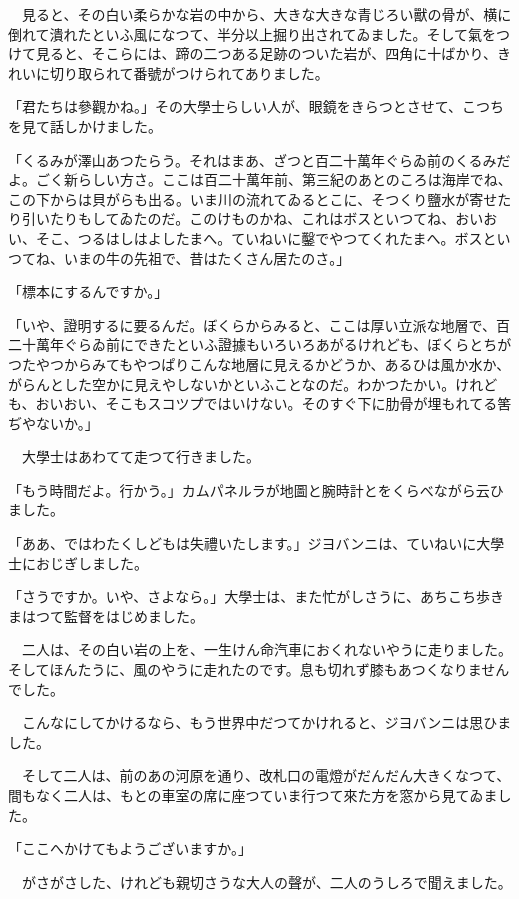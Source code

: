 \documentclass[tate,paper=b6j,jafontsize=9pt]{jlreq}
\begin{document}
　見ると、その白い柔らかな岩の中から、大きな大きな青じろい獸の骨が、横に倒れて潰れたといふ風になつて、半分以上掘り出されてゐました。そして氣をつけて見ると、そこらには、蹄の二つある足跡のついた岩が、四角に十ばかり、きれいに切り取られて番號がつけられてありました。

「君たちは參觀かね。」その大學士らしい人が、眼鏡をきらつとさせて、こつちを見て話しかけました。

「くるみが澤山あつたらう。それはまあ、ざつと百二十萬年ぐらゐ前のくるみだよ。ごく新らしい方さ。ここは百二十萬年前、第三紀のあとのころは海岸でね、この下からは貝がらも出る。いま川の流れてゐるとこに、そつくり鹽水が寄せたり引いたりもしてゐたのだ。このけものかね、これはボスといつてね、おいおい、そこ、つるはしはよしたまへ。ていねいに鑿でやつてくれたまへ。ボスといつてね、いまの牛の先祖で、昔はたくさん居たのさ。」

「標本にするんですか。」

「いや、證明するに要るんだ。ぼくらからみると、ここは厚い立派な地層で、百二十萬年ぐらゐ前にできたといふ證據もいろいろあがるけれども、ぼくらとちがつたやつからみてもやつぱりこんな地層に見えるかどうか、あるひは風か水か、がらんとした空かに見えやしないかといふことなのだ。わかつたかい。けれども、おいおい、そこもスコツプではいけない。そのすぐ下に肋骨が埋もれてる筈ぢやないか。」

　大學士はあわてて走つて行きました。

「もう時間だよ。行かう。」カムパネルラが地圖と腕時計とをくらべながら云ひました。

「ああ、ではわたくしどもは失禮いたします。」ジヨバンニは、ていねいに大學士におじぎしました。

「さうですか。いや、さよなら。」大學士は、また忙がしさうに、あちこち歩きまはつて監督をはじめました。

　二人は、その白い岩の上を、一生けん命汽車におくれないやうに走りました。そしてほんたうに、風のやうに走れたのです。息も切れず膝もあつくなりませんでした。

　こんなにしてかけるなら、もう世界中だつてかけれると、ジヨバンニは思ひました。

　そして二人は、前のあの河原を通り、改札口の電燈がだんだん大きくなつて、間もなく二人は、もとの車室の席に座つていま行つて來た方を窓から見てゐました。



「ここへかけてもようございますか。」

　がさがさした、けれども親切さうな大人の聲が、二人のうしろで聞えました。
\end{document}
